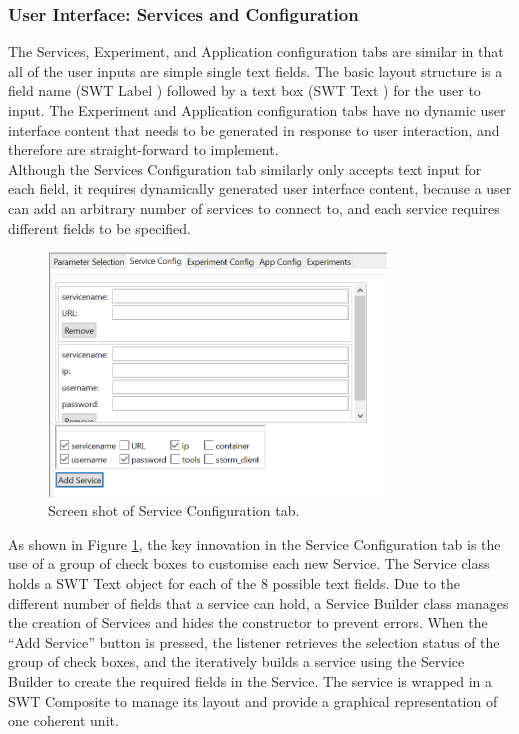 \subsubsection{User Interface: Services and Configuration}
The Services, Experiment, and Application configuration tabs are similar in that all of the user inputs are simple single text fields. The basic layout structure is a field name (SWT Label \cite{swtwidgets}) followed by a text box (SWT Text \cite{swtwidgets}) for the user to input. The Experiment and Application configuration tabs have no dynamic user interface content that needs to be generated in response to user interaction, and therefore are straight-forward to implement.\\
Although the Services Configuration tab similarly only accepts text input for each field, it requires dynamically generated user interface content, because a user can add an arbitrary number of services to connect to, and each service requires different fields to be specified.\\
\begin{figure}[h]
\centering
\caption{Screen shot of Service Configuration tab.}
\label{fig:services}
\includegraphics[width=0.8\textwidth]{images/services.png}
\end{figure}
As shown in Figure \ref{fig:services}, the key innovation in the Service Configuration tab is the use of a group of check boxes to customise each new Service. The Service class holds a SWT Text object for each of the 8 possible text fields. Due to the different number of fields that a service can hold, a Service Builder class manages the creation of Services and hides the constructor to prevent errors. When the ``Add Service'' button is pressed, the listener retrieves the selection status of the group of check boxes, and the iteratively builds a service using the Service Builder to create the required fields in the Service. The service is wrapped in a SWT Composite to manage its layout and provide a graphical representation of one coherent unit.

